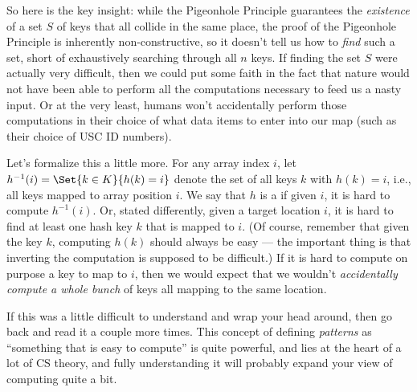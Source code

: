 
So here is the key insight: while the Pigeonhole Principle guarantees
the \emph{existence} of a set $S$ of keys that all collide in the same
place, the proof of the Pigeonhole Principle is inherently
non-constructive, so it doesn't tell us how to \emph{find} such a set,
short of exhaustively searching through all $n$ keys.
If finding the set $S$ were actually very difficult, then we could
put some faith in the fact that nature would not have been able to
perform all the computations necessary to feed us a nasty input.
Or at the very least, humans won't accidentally perform those
computations in their choice of what data items to enter into our
map (such as their choice of USC ID numbers).

Let's formalize this a little more. 
For any array index $i$, let $h^{-1}(i) = \Set{k \in K}{h(k) = i}$
denote the set of all keys $k$ with $h(k) = i$, i.e., all keys mapped
to array position $i$.
We say that $h$ is a  if given $i$, it is
hard to compute $h^{-1}(i)$. Or, stated differently, given a target
location $i$, it is hard to find at least one hash key $k$ that is
mapped to $i$.
(Of course, remember that given the key $k$, computing $h(k)$ should
always be easy --- the important thing is that inverting the
computation is supposed to be difficult.)
If it is hard to compute on purpose a key to map to $i$, then we would
expect that we wouldn't \emph{accidentally compute a whole bunch} of
keys all mapping to the same location.

If this was a little difficult to understand and wrap your head
around, then go back and read it a couple more times. 
This concept of defining \emph{patterns} as ``something that is easy to
compute'' is quite powerful, and lies at the heart of a lot of CS
theory, and fully understanding it will probably expand your view of
computing quite a bit.

